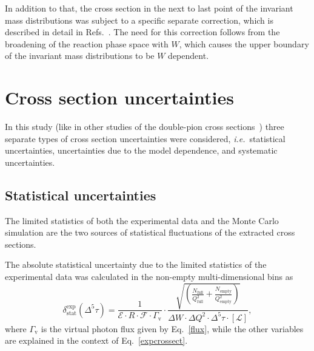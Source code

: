 \documentclass[prc,twocolumn,superscriptaddress,showpacs,amssymb,amsmath,amsfonts,aps,nofootinbib]{revtex4-1}
\begin{document}
In addition to that, the cross section in the next to last point of the invariant mass distributions was subject to a specific separate correction, which is described in detail in Refs.\!~\cite{Fed_an_note:2017,Fed_paper_2018,my_an_note:2020, my_thesis:2021}. The need for this correction follows from the broadening of the reaction phase space with $W$, which causes the upper boundary of the invariant mass distributions to be $W$ dependent.


\section{Cross section uncertainties}
\label{Sect:uncert}

In this study (like in other studies of the double-pion cross sections~\cite{Rip_an_note:2002,Ripani:2002ss,Fed_an_note:2007,Fedotov:2008aa,Isupov:2017lnd,Arjun,Fed_an_note:2017,Fed_paper_2018}) three separate types of cross section uncertainties were considered, {\it i.e.}~statistical uncertainties, uncertainties due to the model dependence, and systematic uncertainties. 

\subsection{Statistical uncertainties}
\label{Sect:stat_uncert}

The limited statistics of both the experimental data and the Monte Carlo simulation are the two sources of statistical fluctuations of the extracted 
cross sections. 


The absolute statistical  uncertainty due to the limited statistics of the experimental data was calculated in the non-empty multi-dimensional bins as
\begin{equation}
\delta_{\text{stat}}^{\text{exp}}(\Delta^{5} \tau) = \frac{1}{\mathcal{E} \! \cdot \! R \! \cdot \! \mathcal{F} \! \cdot \! \Gamma_{\text{v}} }  \cdot  \frac{\sqrt{\left( \frac{N_{\text{full}}}{Q_{\text{full}}^{2}}+\frac{N_{\text{empty}}}{Q_{\text{empty}}^{2}} \right) } }{
\Delta W \! \cdot \!  \Delta Q^{2} \! \cdot \!  \Delta^{5} \tau \! \cdot \! \left [\mathcal{L} \right ]},%
\label{staterrors}
\end{equation}
where $\Gamma_{\text{v}}$ is the virtual photon flux given by Eq.\!~\eqref{flux}, while the other variables are explained in the context of Eq.\!~\eqref{expcrossect}.
\end{document}
